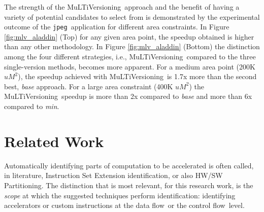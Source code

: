 \documentclass[]{usiinfthesis}
\newcommand{\multi}{MuLTiVersioning}
\newcommand{\dataflow}{data flow}
\newcommand{\controlflow}{control flow}
\newcommand{\jpeg}{\texttt{jpeg}}
\begin{document}
The strength of the \multi\ approach and the benefit of having 
a variety of potential candidates to select from 
is demonstrated by the experimental outcome of the \jpeg\ application for different area constraints. 
In Figure \ref{fig:mlv_aladdin} (Top) for any given area point, the speedup obtained is higher than any other 
methodology. In Figure \ref{fig:mlv_aladdin} (Bottom) the distinction among the four different strategies, i.e., \multi\ compared to the three single-version methods, becomes more apparent. For a medium area point (200K  $uM^2$), the 
speedup achieved with \multi\ is 1.7x more than the second best, \emph{base} approach. For 
a large area constraint (400K $uM^2$) the \multi\ speedup is more than 2x compared to
\emph{base} and more than 6x compared to \emph{min}.\par






\section{Related Work}
\label{sec:rw}

Automatically identifying parts of computation to be
accelerated is often called, in literature, Instruction Set Extension
identification, or also HW/SW Partitioning. The distinction that is most 
relevant, for this research work, is the
\emph{scope} at which the suggested techniques perform identification: 
identifying accelerators or custom instructions at the \dataflow\ or
the \controlflow\ level.\par
\end{document}
